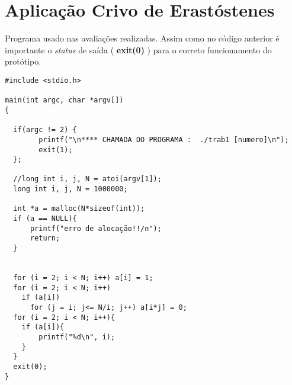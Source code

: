 \chapter{Aplicação Crivo de Erastóstenes}
\label{anexo:crivo}

Programa usado nas avaliações realizadas. Assim como no código anterior é importante o \emph{status} de saída ( \textbf{exit(0)} ) para o correto funcionamento do protótipo.

\begin{scriptsize}
\begin{verbatim}
#include <stdio.h>

main(int argc, char *argv[])
{

  if(argc != 2) {
        printf("\n**** CHAMADA DO PROGRAMA :  ./trab1 [numero]\n");
        exit(1);
  };

  //long int i, j, N = atoi(argv[1]);
  long int i, j, N = 1000000;

  int *a = malloc(N*sizeof(int));
  if (a == NULL){
      printf("erro de alocação!!/n");
      return;
  }


  for (i = 2; i < N; i++) a[i] = 1;
  for (i = 2; i < N; i++)
    if (a[i])
      for (j = i; j<= N/i; j++) a[i*j] = 0;
  for (i = 2; i < N; i++){
    if (a[i]){
        printf("%d\n", i);
    }
  }
  exit(0);
}
\end{verbatim}
\end{scriptsize}

